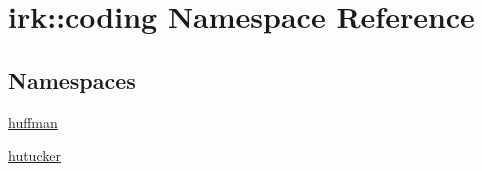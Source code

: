 \hypertarget{namespaceirk_1_1coding}{}\section{irk\+:\+:coding Namespace Reference}
\label{namespaceirk_1_1coding}
\subsection*{Namespaces}
\begin{DoxyCompactItemize}
\item 
 \mbox{\hyperlink{namespaceirk_1_1coding_1_1huffman}{huffman}}
\item 
 \mbox{\hyperlink{namespaceirk_1_1coding_1_1hutucker}{hutucker}}
\end{DoxyCompactItemize}
